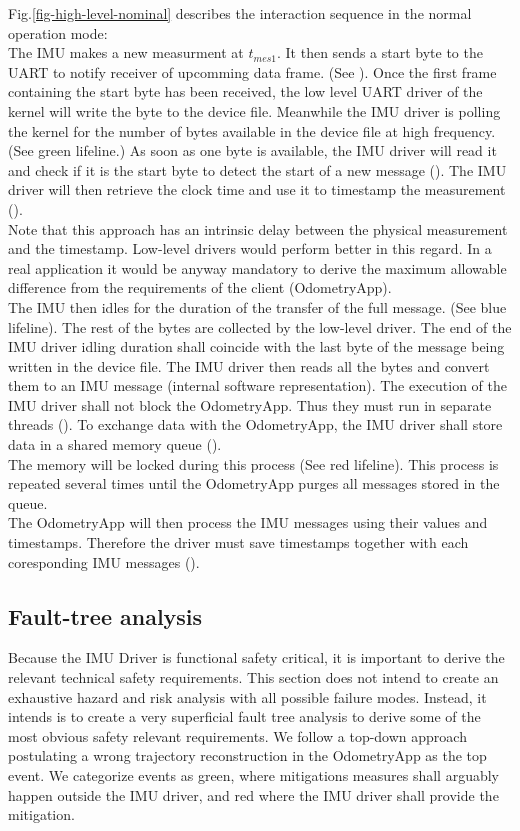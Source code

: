 Fig.\ref{fig-high-level-nominal} describes the interaction sequence in the normal operation mode:\\
The IMU makes a new measurment at $t_{mes1}$.
It then sends a start byte to the UART to notify receiver of upcomming data frame. (See ).
Once the first frame containing the start byte has been received, the low level UART driver of the kernel will write the byte to the device file.
Meanwhile the IMU driver is polling the kernel for the number of bytes available in the device file at high frequency. (See green lifeline.)
As soon as one byte is available, the IMU driver will read it and check if it is the start byte to detect the start of a new message ().
The IMU driver will then retrieve the clock time and use it to timestamp the measurement ().\\
Note that this approach has an intrinsic delay between the physical measurement and the timestamp.
Low-level drivers would perform better in this regard. In a real application it would be anyway mandatory to derive the maximum allowable difference from the requirements of the client (OdometryApp).\\
The IMU then idles for the duration of the transfer of the full message. (See blue lifeline).
The rest of the bytes are collected by the low-level driver.
The end of the IMU driver idling duration shall coincide with the last byte of the message being written in the device file.
The IMU driver then reads all the bytes and convert them to an IMU message (internal software representation).
The execution of the IMU driver shall not block the OdometryApp. Thus they must run in separate threads ().
To exchange data with the OdometryApp, the IMU driver shall store data in a shared memory queue ().\\
The memory will be locked during this process (See red lifeline).
This process is repeated several times until the OdometryApp purges all messages stored in the queue.\\
The OdometryApp will then process the IMU messages using their values and timestamps.
Therefore the driver must save timestamps together with each coresponding IMU messages ().

\subsection{Fault-tree analysis}
Because the IMU Driver is functional safety critical, it is important to derive the relevant technical safety requirements.
This section does not intend to create an exhaustive hazard and risk analysis with all possible failure modes.
Instead, it intends is to create a very superficial fault tree analysis to derive some of the most obvious safety relevant requirements.
We follow a top-down approach postulating a wrong trajectory reconstruction in the OdometryApp as the top event.
We categorize events as green, where mitigations measures shall arguably happen outside the IMU driver, and red where the IMU driver shall provide the mitigation.

